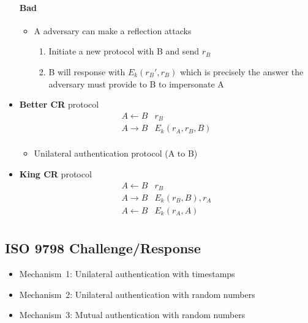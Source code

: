 \begin{itemize}
        \paragraph{Bad}
        \begin{itemize}
        \item A adversary can make a reflection attacks
            \begin{enumerate}
                \item Initiate a new protocol with B and send $r_B$
                \item B will response with $E_k(r_B', r_B)$ which is
                    precisely the answer the adversary must provide
                    to B to impersonate A
            \end{enumerate}
        \end{itemize}

    \item \textbf{Better CR} protocol
        \begin{eqnarray*}
            A \leftarrow B & r_B \\
            A \rightarrow B & E_k(r_A, r_B, B) \\
        \end{eqnarray*}

        \begin{itemize}
            \item Unilateral authentication protocol (A to B)
        \end{itemize}

    \item \textbf{King CR} protocol
        \begin{eqnarray*}
            A \leftarrow B & r_B \\
            A \rightarrow B & E_k(r_B, B), r_A \\
            A \leftarrow B & E_k(r_A, A) \\
        \end{eqnarray*}
\end{itemize}


\subsection{ISO 9798 Challenge/Response}
\begin{itemize}
    \item Mechanism~1: Unilateral authentication with timestamps
    \item Mechanism~2: Unilateral authentication with random numbers
    \item Mechanism~3: Mutual authentication with random numbers
\end{itemize}

